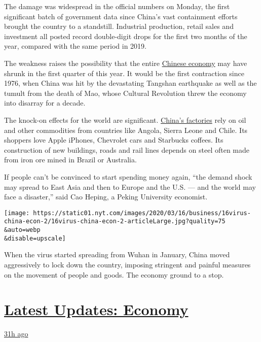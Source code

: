 The damage was widespread in the official numbers on Monday, the first
significant batch of government data since China's vast containment
efforts brought the country to a standstill. Industrial production,
retail sales and investment all posted record double-digit drops for the
first two months of the year, compared with the same period in 2019.

The weakness raises the possibility that the entire
\href{https://www.nytimes.com/2020/04/28/business/china-coronavirus-economy.html}{Chinese
economy} may have shrunk in the first quarter of this year. It would be
the first contraction since 1976, when China was hit by the devastating
Tangshan earthquake as well as the tumult from the death of Mao, whose
Cultural Revolution threw the economy into disarray for a decade.

The knock-on effects for the world are significant.
\href{https://www.nytimes.com/2020/04/28/business/china-coronavirus-economy.html}{China's
factories} rely on oil and other commodities from countries like Angola,
Sierra Leone and Chile. Its shoppers love Apple iPhones, Chevrolet cars
and Starbucks coffees. Its construction of new buildings, roads and rail
lines depends on steel often made from iron ore mined in Brazil or
Australia.

If people can't be convinced to start spending money again, ``the demand
shock may spread to East Asia and then to Europe and the U.S. --- and
the world may face a disaster,'' said Cao Heping, a Peking University
economist.

\texttt{[image: https://static01.nyt.com/images/2020/03/16/business/16virus-china-econ-2/16virus-china-econ-2-articleLarge.jpg?quality=75\\\&auto=webp\\\&disable=upscale]}

When the virus started spreading from Wuhan in January, China moved
aggressively to lock down the country, imposing stringent and painful
measures on the movement of people and goods. The economy ground to a
stop.

\hypertarget{latest-updates-economy}{%
\section{\texorpdfstring{\href{https://www.nytimes.com/live/2020/07/31/business/stock-market-today-coronavirus?action=click\&pgtype=Article\&state=default\&region=MAIN_CONTENT_1\&context=storylines_live_updates}{Latest
Updates:
Economy}}{Latest Updates: Economy}}\label{latest-updates-economy}}

\href{https://www.nytimes.com/live/2020/07/31/business/stock-market-today-coronavirus?action=click\&pgtype=Article\&state=default\&region=MAIN_CONTENT_1\&context=storylines_live_updates\#kodaks-chief-executive-was-given-stock-options-then-the-share-price-spiked-1000-percent}{31h
ago}

